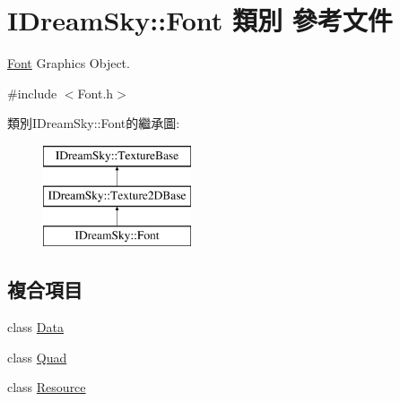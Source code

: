 \hypertarget{class_i_dream_sky_1_1_font}{}\section{I\+Dream\+Sky\+:\+:Font 類別 參考文件}
\label{class_i_dream_sky_1_1_font}


\hyperlink{class_i_dream_sky_1_1_font}{Font} Graphics Object.  




{\ttfamily \#include $<$Font.\+h$>$}

類別\+I\+Dream\+Sky\+:\+:Font的繼承圖\+:\begin{figure}[H]
\begin{center}
\leavevmode
\includegraphics[height=3.000000cm]{class_i_dream_sky_1_1_font}
\end{center}
\end{figure}
\subsection*{複合項目}
\begin{DoxyCompactItemize}
\item 
class \hyperlink{class_i_dream_sky_1_1_font_1_1_data}{Data}
\item 
class \hyperlink{class_i_dream_sky_1_1_font_1_1_quad}{Quad}
\item 
class \hyperlink{class_i_dream_sky_1_1_font_1_1_resource}{Resource}
\end{DoxyCompactItemize}
